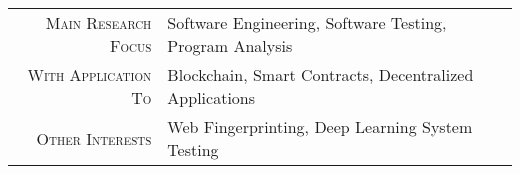 \begin{tabular}{rl}
    \textsc{Main Research Focus} & Software Engineering, Software Testing, Program Analysis \\
    \textsc{With Application To} & Blockchain, Smart Contracts, Decentralized Applications  \\
    \textsc{Other Interests}     & Web Fingerprinting, Deep Learning System Testing         \\
\end{tabular}